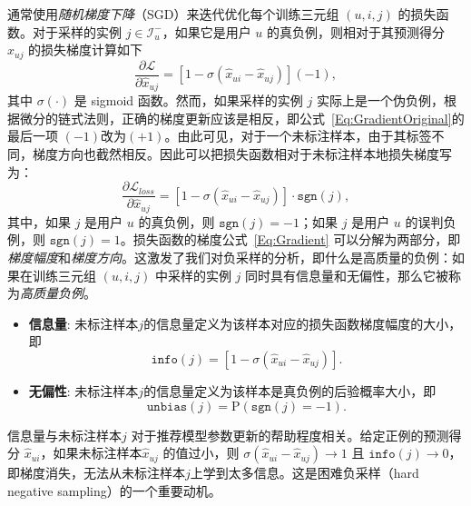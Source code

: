 \par
通常使用\textit{随机梯度下降}（SGD）来迭代优化每个训练三元组 $(u, i, j)$ 的损失函数。对于采样的实例 $j \in \mathcal{I}_u^-$，如果它是用户 $u$ 的真负例，则相对于其预测得分 $\hat{x}_{uj}$ 的损失梯度计算如下
\begin{equation}\label{Eq:GradientOriginal}
	\frac{\partial \mathcal{L} }{\partial \hat{x}_{uj}} = [1-\sigma(\hat{x}_{ui} - \hat{x}_{uj})] (-1),
\end{equation}
其中 $\sigma(\cdot)$ 是 \textsf{sigmoid} 函数。然而，如果采样的实例 $j$ 实际上是一个伪负例，根据微分的链式法则，正确的梯度更新应该是相反，即公式~\eqref{Eq:GradientOriginal}的最后一项 $(-1)$改为$(+1)$。由此可见，对于一个未标注样本，由于其标签不同，梯度方向也截然相反。因此可以把损失函数相对于未标注样本地损失梯度写为：
\begin{equation}\label{Eq:Gradient}
	\frac{\partial \mathcal{L}_{loss} }{\partial \hat{x}_{uj}} = [1-\sigma(\hat{x}_{ui} - \hat{x}_{uj})] \cdot \mathtt{sgn}(j),
\end{equation}
其中，如果 $j$ 是用户 $u$ 的真负例，则 $\mathtt{sgn}(j)=-1$；如果 $j$ 是用户 $u$ 的误判负例，则 $\mathtt{sgn}(j)=1$。损失函数的梯度公式~\eqref{Eq:Gradient} 可以分解为两部分，即\textit{梯度幅度}和\textit{梯度方向}。这激发了我们对负采样的分析，即什么是高质量的负例：如果在训练三元组 $(u,i,j)$ 中采样的实例 $j$ 同时具有信息量和无偏性，那么它被称为\textit{高质量负例}。
\begin{itemize}
	\item \textbf{信息量}: 未标注样本$j$的信息量定义为该样本对应的损失函数梯度幅度的大小，即
	\begin{equation}\label{Eq:Informativeness}
		\mathtt{info}(j) =  [1-\sigma(\hat{x}_{ui} - \hat{x}_{uj})].
	\end{equation}
	\item \textbf{无偏性}: 未标注样本$j$的信息量定义为该样本是真负例的后验概率大小，即
	\begin{equation}\label{Eq:Unbiasedness}
		\mathtt{unbias}(j) = \mathrm{P}(\mathtt{sgn}(j) = -1).
	\end{equation}
\end{itemize}

信息量与未标注样本$j$ 对于推荐模型参数更新的帮助程度相关。给定正例的预测得分 $\hat{x}_{ui}$，如果未标注样本$\hat{x}_{uj}$ 的值过小，则 $\sigma(\hat{x}_{ui} - \hat{x}_{uj}) \rightarrow 1$ 且 $\mathtt{info}(j) \rightarrow 0$，即梯度消失，无法从未标注样本$j$上学到太多信息。这是困难负采样（hard negative sampling）的一个重要动机。

